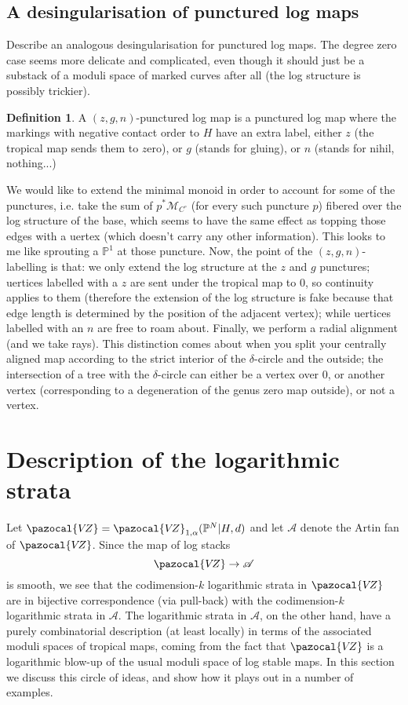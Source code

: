 \documentclass[11pt]{amsart}
\newcommand{\PP}{\mathbb P}
\newcommand{\VZ}{\pazocal{V\!Z}}
\renewcommand{\to}{\rightarrow}
\newcommand{\Acal}{\mathcal{A}}
\theoremstyle{definition}
\theoremstyle{definition}
\newtheorem{dfn}[thm]{Definition}
\begin{document}
\subsection{A desingularisation of punctured log maps}
Describe an analogous desingularisation for punctured log maps. The degree zero case seems more delicate and complicated, even though it should just be a substack of a moduli space of marked curves after all (the log structure is possibly trickier).
\begin{dfn}
 A $(z,g,n)$-punctured log map is a punctured log map where the markings with negative contact order to $H$ have an extra label, either $z$ (the tropical map sends them to $z$ero), or $g$ (stands for gluing), or $n$ (stands for nihil, nothing...)
\end{dfn}
We would like to extend the minimal monoid in order to account for some of the punctures, i.e. take the sum of $p^*\mathcal M_{C^\circ}$ (for every such puncture $p$) fibered over the log structure of the base, which seems to have the same effect as topping those edges with a uertex (which doesn't carry any other information). This looks to me like sprouting a $\PP^1$ at those puncture. Now, the point of the $(z,g,n)$-labelling is that: we only extend the log structure at the $z$ and $g$ punctures; uertices labelled with a $z$ are sent under the tropical map to $0$, so continuity applies to them (therefore the extension of the log structure is fake because that edge length is determined by the position of the adjacent vertex); while uertices labelled with an $n$ are free to roam about. Finally, we perform a radial alignment (and we take rays). This distinction comes about when you split your centrally aligned map according to the strict interior of the $\delta$-circle and the outside; the intersection of a tree with the $\delta$-circle can either be a vertex over $0$, or another vertex (corresponding to a degeneration of the genus zero map outside), or not a vertex.

\newpage

\section{Description of the logarithmic strata}
\noindent Let $\VZ = \VZ_{1,\alpha}(\PP^N|H,d)$ and let $\Acal$ denote the Artin fan of $\VZ$. Since the map of log stacks
\begin{equation*} \VZ \to \Acal \end{equation*}
is smooth, we see that the codimension-$k$ logarithmic strata in $\VZ$ are in bijective correspondence (via pull-back) with the codimension-$k$ logarithmic strata in $\Acal$. The logarithmic strata in $\Acal$, on the other hand, have a purely combinatorial description (at least locally) in terms of the associated moduli spaces of tropical maps, coming from the fact that $\VZ$ is a logarithmic blow-up of the usual moduli space of log stable maps. In this section we discuss this circle of ideas, and show how it plays out in a number of examples.
\end{document}
